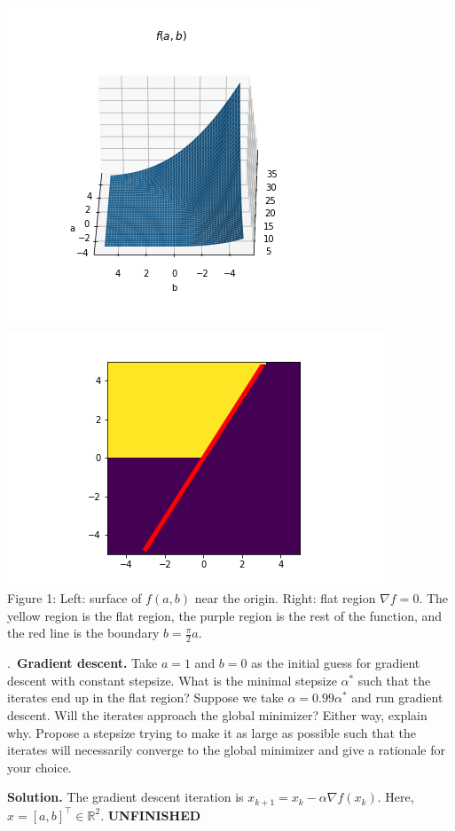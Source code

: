 \documentclass{letter}
\newcounter{problem}
\newcommand{\Problem}[2]{%
	\stepcounter{problem}%
	\leftskip=0pt%
	\theproblem.~\textbf{{#1.}} #2 \par%
}
\newcommand{\Solution}[1]{%
	\textbf{Solution.} #1 \par%
}
\newcommand{\UNFINISHED}{\textbf{\color{red} UNFINISHED}}
\newcommand{\T}{\intercal}
\newcommand{\R}{\mathbb{R}}
\begin{document}
{    \begin{center}
        \includegraphics[trim={1cm 1cm 1cm 0cm},clip,scale=0.7]{../pics/loss_surface.png} \includegraphics[trim={1cm 0cm 1cm 0cm},clip,scale=0.7]{../pics/flat_region.png}\\
        Figure 1: Left: surface of $f(a, b)$ near the origin. Right: flat region $\nabla f = 0$. The yellow region is the flat region, the purple region is the rest of the function, and the red line is the boundary $b = \frac{\pi}{2}a$.
    \end{center}}

    \Problem{Gradient descent}{Take $a = 1$ and $b = 0$ as the initial guess for gradient descent with constant stepsize. What is the minimal stepsize $\alpha^*$ such that the iterates end up in the flat region? Suppose we take $\alpha = 0.99\alpha^*$ and run gradient descent. Will the iterates approach the global minimizer? Either way, explain why. Propose a stepsize trying to make it as large as possible such that the iterates will necessarily converge to the global minimizer and give a rationale for your choice.}
    \Solution{The gradient descent iteration is $x_{k+1} = x_k - \alpha \nabla f(x_k)$. Here, $x = [a, b]^\T \in \R^2$.\UNFINISHED}
\end{document}
